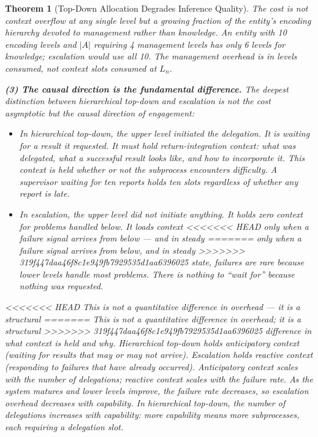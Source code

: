 \documentclass[11pt]{article}
\newtheorem{theorem}{Theorem}
\theoremstyle{definition}
\begin{document}
\begin{theorem}[Top-Down Allocation Degrades Inference Quality]
The cost is not context overflow at any single level but a growing
fraction of the entity's encoding hierarchy devoted to management rather
than knowledge. An entity with 10 encoding levels and $|A|$ requiring
4 management levels has only 6 levels for knowledge; escalation would
use all 10. The management overhead is in \emph{levels consumed}, not
\emph{context slots consumed at $L_n$}.

\textbf{(3) The causal direction is the fundamental difference.}
The deepest distinction between hierarchical top-down and escalation is
not the cost asymptotic but the \emph{causal direction of engagement}:

\begin{itemize}
\item In hierarchical top-down, the upper level \emph{initiated} the
   delegation. It is waiting for a result it requested. It must hold
   return-integration context: what was delegated, what a successful
   result looks like, and how to incorporate it. This context is held
   \emph{whether or not the subprocess encounters difficulty}. A
   supervisor waiting for ten reports holds ten slots regardless of
   whether any report is late.

\item In escalation, the upper level \emph{did not initiate} anything.
   It holds zero context for problems handled below. It loads context
<<<<<<< HEAD
   only when a failure signal arrives from below --- and in steady
=======
   only when a failure signal arrives from below, and in steady
>>>>>>> 319f447daa46f8c1e949fb7929535d1aa6396025
   state, failures are rare because lower levels handle most problems.
   There is nothing to ``wait for'' because nothing was requested.
\end{itemize}

<<<<<<< HEAD
This is not a quantitative difference in overhead --- it is a structural
=======
This is not a quantitative difference in overhead; it is a structural
>>>>>>> 319f447daa46f8c1e949fb7929535d1aa6396025
difference in what context is held and why. Hierarchical top-down holds
\emph{anticipatory context} (waiting for results that may or may not
arrive). Escalation holds \emph{reactive context} (responding to
failures that have already occurred). Anticipatory context scales with
the number of delegations; reactive context scales with the failure rate.
As the system matures and lower levels improve, the failure rate
decreases, so escalation overhead \emph{decreases with capability}. In
hierarchical top-down, the number of delegations \emph{increases with
capability}: more capability means more subprocesses, each requiring a
delegation slot.


\end{theorem}
\end{document}
